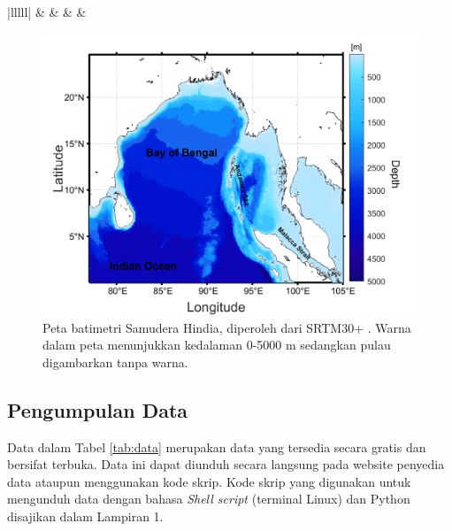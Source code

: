 \begin{spacing}{1.5}
\begin{table}[H]
{\begin{tabular}{|lllll|}
			 &  &  &                                                                & \cite{Lan2013}               \\ \hline
		\end{tabular}%
	}
	\end{table}
	\begin{figure}[H]
		\centering
		\includegraphics[width=12cm]{contents/Figures/Batimetri_edit_compress}
		\caption{Peta batimetri Samudera Hindia, diperoleh dari SRTM30+ \protect\cite{becker2009global}. Warna dalam peta menunjukkan kedalaman 0-5000 m sedangkan pulau digambarkan tanpa warna.}
		\label{fig:domain}
	\end{figure}
	\subsection[Pengumpulan Data]{Pengumpulan Data}
	Data dalam Tabel \ref{tab:data} merupakan data yang tersedia secara gratis dan bersifat terbuka. Data ini dapat diunduh secara langsung pada website penyedia data ataupun menggunakan kode skrip. Kode skrip yang digunakan untuk mengunduh data dengan bahasa \textit{Shell script} (terminal Linux) dan Python disajikan dalam Lampiran 1.
	
\end{spacing}
\vspace{-0.5pc}
